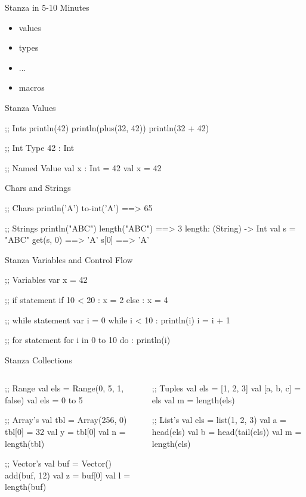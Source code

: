 \begin{frame}[fragile]{Stanza in 5-10 Minutes}
\begin{itemize}
\item values
\item types
\item ...  
\item macros
\end{itemize}
\end{frame}

\begin{frame}[fragile]{Stanza Values}
\begin{stanza}
;; Ints
println(42)
println(plus(32, 42))
println(32 + 42)

;; Int Type
42 : Int

;; Named Value
val x : Int = 42
val x = 42
\end{stanza}
\end{frame}

\begin{frame}[fragile]{Chars and Strings}
\begin{stanza}
;; Chars
println('A')
to-int('A') ==> 65

;; Strings
println("ABC")
length("ABC") ==> 3
length: (String) -> Int
val s = "ABC"
get(s, 0) ==> 'A'
s[0] ==> 'A'
\end{stanza}
\end{frame}

\begin{frame}[fragile]{Stanza Variables and Control Flow}
\begin{stanza}
;; Variables
var x = 42

;; if statement
if 10 < 20 :
  x = 2
else :
  x = 4   

;; while statement
var i = 0
while i < 10 :
  println(i)
  i = i + 1
  
;; for statement
for i in 0 to 10 do :
  println(i)
\end{stanza}
\end{frame}

\begin{frame}[fragile]{Stanza Collections}
\begin{columns}
\begin{stanza}
;; Range
val els = Range(0, 5, 1, false)
val els = 0 to 5

;; Array's
val tbl = Array(256, 0)
tbl[0] = 32
val y = tbl[0]
val n = length(tbl)

;; Vector's
val buf = Vector()
add(buf, 12)
val z = buf[0]
val l = length(buf)
\end{stanza}
\begin{stanza}
;; Tuples
val els = [1, 2, 3]
val [a, b, c] = els
val m = length(els)

;; List's
val els = list(1, 2, 3)
val a = head(els)
val b = head(tail(els))
val m = length(els)
\end{stanza}
\end{columns}
\end{frame}

